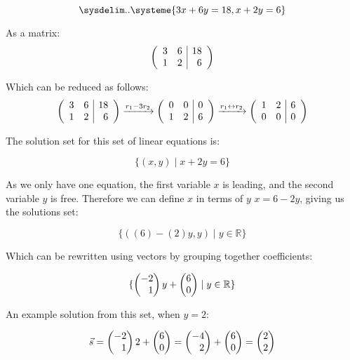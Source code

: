 \documentclass[12pt]{article}
\newenvironment{abc}{\begin{enumerate}[label={\bf(\alph*)}]}{\end{enumerate}}
\newcommand\m[2][]{
	\ifthenelse{\equal {#1} {}}
		{\begin{pmatrix*}[r]#2\end{pmatrix*}}
		{\left(\begin{array}{#1}#2\end{array}\right)}
}
\newcommand\resetequation[1][1]{\setcounter{equation}{#1 - 1}}
\begin{document}
\begin{abc}
	\begin{item}
	\resetequation
	\begin{equation}
		\sysdelim..\systeme{3x + 6y = 18, x + 2y = 6}
	\end{equation}

	As a matrix:
	\begin{equation}
		\m[rr|r]{3 & 6 & 18 \\ 1 & 2 & 6}
	\end{equation}

	Which can be reduced as follows:
	\begin{equation}
		\m[rr|r]{3 & 6 & 18 \\ 1 & 2 & 6}
		\xrightarrow{r_1 - 3r_2}
		\m[rr|r]{0 & 0 & 0 \\ 1 & 2 & 6}
		\xrightarrow{r_1 \leftrightarrow r_2}
		\m[rr|r]{1 & 2 & 6 \\ 0 & 0 & 0}
	\end{equation}

	The solution set for this set of linear equations is:

	\begin{equation}
		\{ (x, y) \mid x + 2y = 6 \}
	\end{equation}

	As we only have one equation, the first variable $x$ is leading, and the
	second variable $y$ is free. Therefore we can define $x$ in terms of $y$
	$ x = 6 - 2y $, giving us the solutions set:

	\begin{equation}
		\{ ((6) - (2)y, y) \mid y \in \mathbb{R} \}
	\end{equation}

	Which can be rewritten using vectors by grouping together coefficients:

	\begin{equation}
		\{\m{-2 \\ 1}y + \m{6 \\ 0} \mid y \in \mathbb{R} \}
	\end{equation}

	An example solution from this set, when $y = 2$:

	\begin{equation}
		\vec{s} = \m{-2 \\ 1}2 + \m{6 \\ 0} = \m{-4 \\ 2} + \m{6 \\ 0} = \m{2 \\ 2}
	\end{equation}


\end{item}
\end{abc}
\end{document}
